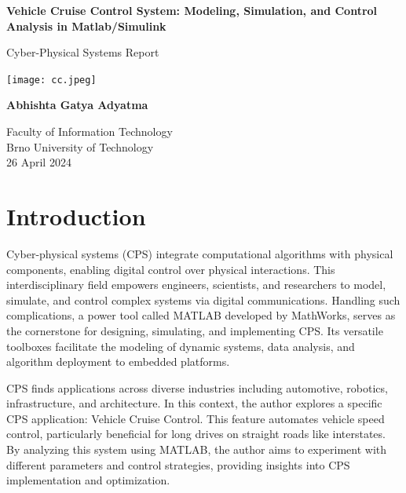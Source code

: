 \documentclass{article}
\begin{document}
\begin{titlepage}
    \begin{center}
        \vspace*{1cm}

        \Large
        \textbf{Vehicle Cruise Control System: Modeling, Simulation, and Control Analysis in Matlab/Simulink}

       \vspace{0.5cm}
        Cyber-Physical Systems Report 
            
        \vspace{1.5cm}
        \texttt{[image: cc.jpeg]}

       \vfill

        \textbf{Abhishta Gatya Adyatma}
            
        \vspace{0.8cm}
                 
        Faculty of Information Technology\\
        Brno University of Technology\\
        26 April 2024
            
   \end{center}
\end{titlepage}

\tableofcontents
\newpage

\section{Introduction}

Cyber-physical systems (CPS) integrate computational algorithms with physical components, enabling digital control over physical interactions. This interdisciplinary field empowers engineers, scientists, and researchers to model, simulate, and control complex systems via digital communications. Handling such complications, a power tool called MATLAB developed by MathWorks, serves as the cornerstone for designing, simulating, and implementing CPS. Its versatile toolboxes facilitate the modeling of dynamic systems, data analysis, and algorithm deployment to embedded platforms.

CPS finds applications across diverse industries including automotive, robotics, infrastructure, and architecture. In this context, the author explores a specific CPS application: Vehicle Cruise Control. This feature automates vehicle speed control, particularly beneficial for long drives on straight roads like interstates. By analyzing this system using MATLAB, the author aims to experiment with different parameters and control strategies, providing insights into CPS implementation and optimization.
\end{document}
